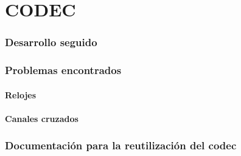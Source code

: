 \part{CODEC}
	
	
\section{Desarrollo seguido}
	
\section{Problemas encontrados}

	\subsection{Relojes}

	\subsection{Canales cruzados}
	
\section{Documentación para la reutilización del codec}
	
